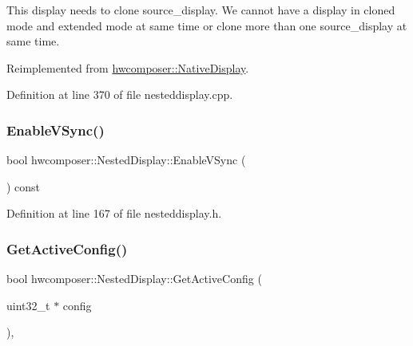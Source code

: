 This display needs to clone source\+\_\+display. We cannot have a display in cloned mode and extended mode at same time or clone more than one source\+\_\+display at same time. 

Reimplemented from \mbox{\hyperlink{classhwcomposer_1_1NativeDisplay_ad244fa57c9c6380fb04bfd57da3cb28b}{hwcomposer\+::\+Native\+Display}}.



Definition at line 370 of file nesteddisplay.\+cpp.


\begin{DoxyCode}{0}
\end{DoxyCode}
\mbox{\label{classhwcomposer_1_1NestedDisplay_a4edac628f8ce493c9417cf691807b3a6}} 
\subsubsection{\texorpdfstring{Enable\+V\+Sync()}{EnableVSync()}}
{\footnotesize\ttfamily bool hwcomposer\+::\+Nested\+Display\+::\+Enable\+V\+Sync (\begin{DoxyParamCaption}{ }\end{DoxyParamCaption}) const\hspace{0.3cm}{\ttfamily [inline]}}



Definition at line 167 of file nesteddisplay.\+h.


\begin{DoxyCode}{0}
\end{DoxyCode}
\mbox{\label{classhwcomposer_1_1NestedDisplay_ac29629de6ce1e74a1086e8de7239b45a}} 
\subsubsection{\texorpdfstring{Get\+Active\+Config()}{GetActiveConfig()}}
{\footnotesize\ttfamily bool hwcomposer\+::\+Nested\+Display\+::\+Get\+Active\+Config (\begin{DoxyParamCaption}\item[{uint32\+\_\+t $\ast$}]{config }\end{DoxyParamCaption})\hspace{0.3cm}{\ttfamily [override]}, {\ttfamily [virtual]}}



